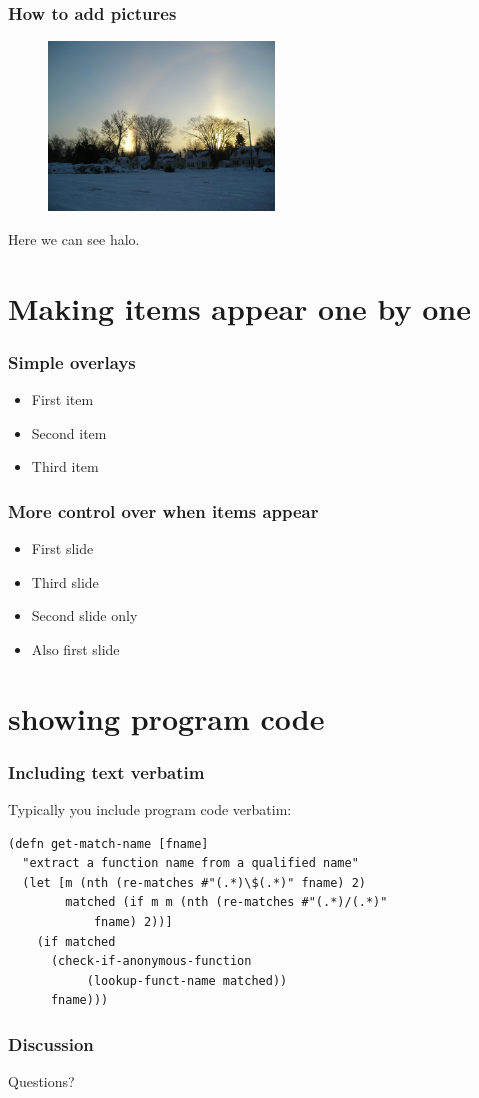 \documentclass{beamer}
\begin{document}
\begin{frame}
  \frametitle{How to add pictures}
\begin{figure}
\includegraphics[height=45mm]{halo.jpg}
\end{figure}

Here we can see halo. 
\end{frame}

\section{Making items appear one by one}

\begin{frame}
  \frametitle{Simple overlays}
\begin{itemize}
\item First item 
\pause
\item Second item
\pause
\item Third item
\end{itemize}
\end{frame}

\begin{frame}
\frametitle{More control over when items appear}
\begin{itemize}
\item <1-> First slide
\item <3> Third slide
\item <2>Second slide only
\item <1->Also first slide
\end{itemize}
\end{frame}

\section{showing program code}

\begin{frame}[fragile]
\frametitle{Including text verbatim}
Typically you include program code verbatim:
\begin{verbatim}
(defn get-match-name [fname]
  "extract a function name from a qualified name"
  (let [m (nth (re-matches #"(.*)\$(.*)" fname) 2)
        matched (if m m (nth (re-matches #"(.*)/(.*)" 
            fname) 2))]
    (if matched
      (check-if-anonymous-function 
           (lookup-funct-name matched))
      fname)))
\end{verbatim}
\end{frame}

\begin{frame}
  \frametitle{Discussion}
Questions?
\end{frame}
\end{document}
